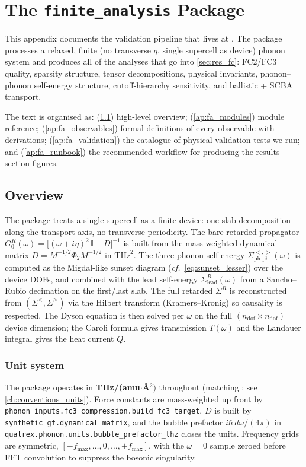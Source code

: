 \chapter{The \texttt{finite\_analysis} Package}
\label{ap:finite_analysis}

This appendix documents the validation pipeline that lives at
.  The package processes a relaxed,
finite (no transverse $q$, single supercell as device) phonon system
and produces all of the analyses that go into
\cref{sec:res_fc}: FC2/FC3 quality, sparsity structure,
tensor decompositions, physical invariants, phonon--phonon
self-energy structure, cutoff-hierarchy sensitivity, and ballistic +
SCBA transport.

The text is organised as: (\ref{ap:fa_overview}) high-level overview;
(\ref{ap:fa_modules}) module reference; (\ref{ap:fa_observables})
formal definitions of every observable with derivations; (\ref{ap:fa_validation})
the catalogue of physical-validation tests we run; and
(\ref{ap:fa_runbook}) the recommended workflow for producing the
results-section figures.

\section{Overview}
\label{ap:fa_overview}

The package treats a single supercell as a finite device: one slab
decomposition along the transport axis, no transverse periodicity.
The bare retarded propagator
$G^R_0(\omega) = \bigl[(\omega + i\eta)^2\,\mathbb{I} - D\bigr]^{-1}$
is built from the mass-weighted dynamical matrix $D = M^{-1/2}\Phi_2 M^{-1/2}$
in $\mathrm{THz}^2$.  The three-phonon self-energy
$\Sigma^{<,>}_{\mathrm{ph\text{-}ph}}(\omega)$ is computed as the
Migdal-like sunset diagram (\textit{cf.}\ \cref{eq:sunset_lesser})
over the device DOFs, and combined with the lead self-energy
$\Sigma_{\mathrm{lead}}^R(\omega)$ from a Sancho--Rubio decimation on
the first/last slab.  The full retarded $\Sigma^R$ is reconstructed
from $(\Sigma^<, \Sigma^>)$ via the Hilbert transform (Kramers--Kronig)
so causality is respected.  The Dyson equation is then solved per
$\omega$ on the full $(n_{\mathrm{dof}} \times n_{\mathrm{dof}})$
device dimension; the Caroli formula gives transmission $T(\omega)$
and the Landauer integral gives the heat current $Q$.

\subsection*{Unit system}
The package operates in \textbf{THz/(amu$\cdot$\AA$^2)$} throughout
(matching ; see
\cref{ch:conventions_units}).  Force constants are mass-weighted up
front by \texttt{phonon\_inputs.fc3\_compression.build\_fc3\_target},
$D$ is built by \texttt{synthetic\_gf.dynamical\_matrix}, and the
bubble prefactor $i\hbar\,d\omega/(4\pi)$ in
\texttt{quatrex.phonon.units.bubble\_prefactor\_thz} closes the
units.  Frequency grids are symmetric, $[-f_{\max}, \dots, 0, \dots,
+f_{\max}]$, with the $\omega = 0$ sample zeroed before FFT
convolution to suppress the bosonic singularity.

